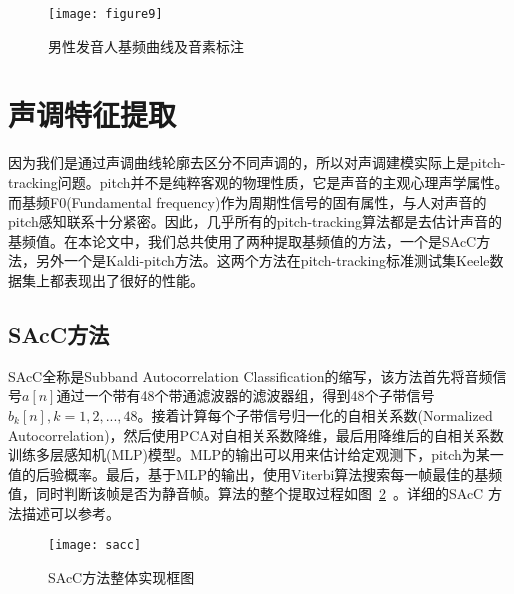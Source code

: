 \begin{figure}[htbp]
\centering
\texttt{[image: figure9]}
\caption{男性发音人基频曲线及音素标注}\label{fig:figure9}
\vspace{\baselineskip}
\end{figure}

\section{声调特征提取}
因为我们是通过声调曲线轮廓去区分不同声调的，所以对声调建模实际上是pitch-tracking问题。pitch并不是纯粹客观的物理性质，它是声音的主观心理声学属性。而基频F0(Fundamental frequency)作为周期性信号的固有属性，与人对声音的pitch感知联系十分紧密。因此，几乎所有的pitch-tracking算法都是去估计声音的基频值\cite{kleijn1995robust}。在本论文中，我们总共使用了两种提取基频值的方法，一个是SAcC方法\cite{lee2012noise}，另外一个是Kaldi-pitch方法\cite{ghahremani2014pitch}。这两个方法在pitch-tracking标准测试集Keele数据集\cite{plante1995pitch}上都表现出了很好的性能。
\subsection{SAcC方法}
SAcC全称是Subband Autocorrelation Classification的缩写，该方法首先将音频信号$a[n]$通过一个带有48个带通滤波器的滤波器组，得到48个子带信号$b_k[n],k=1,2,...,48$。接着计算每个子带信号归一化的自相关系数(Normalized Autocorrelation)，然后使用PCA对自相关系数降维，最后用降维后的自相关系数训练多层感知机(MLP)模型。MLP的输出可以用来估计给定观测下，pitch为某一值的后验概率。最后，基于MLP的输出，使用Viterbi算法搜索每一帧最佳的基频值，同时判断该帧是否为静音帧。算法的整个提取过程如图~\ref{fig:sacc}~。详细的SAcC 方法描述可以参考\cite{lee2012noise}。
\begin{figure}[htbp]
\centering
\texttt{[image: sacc]}
\caption{SAcC方法整体实现框图\cite{lee2012noise}}\label{fig:sacc}
\vspace{\baselineskip}
\end{figure}

